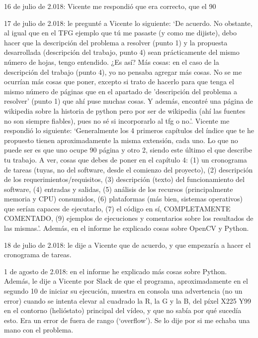 \documentclass[12pt]{article}
\begin{document}
16 de julio de 2.018: Vicente me respondió que era correcto, que el 90%

17 de julio de 2.018: le pregunté a Vicente lo siguiente: ‘De acuerdo. No obstante, al igual que en el TFG ejemplo que tú me pasaste (y como me dijiste), debo hacer que la descripción del problema a resolver (punto 1) y la propuesta desarrollada (descripción del trabajo, punto 4) sean prácticamente del mismo número de hojas, tengo entendido. ¿Es así? Más cosas: en el caso de la descripción del trabajo (punto 4), yo no pensaba agregar más cosas. No se me ocurrían más cosas que poner, excepto si trato de hacerlo para que tenga el mismo número de páginas que en el apartado de 'descripción del problema a resolver' (punto 1) que ahí puse muchas cosas. Y además, encontré una página de wikipedia sobre la historia de python pero por ser de wikipedia (ahí las fuentes no son siempre fiables), pues no sé si incorporarlo al tfg o no.’. Vicente me respondió lo siguiente: ‘Generalmente los 4 primeros capítulos del índice que te he propuesto tienen aproximadamente la misma extensión, cada uno. Lo que no puede ser es que uno ocupe 90 página y otro 2, siendo este último el que describe tu trabajo. A ver, cosas que debes de poner en el capítulo 4: (1) un cronograma de tareas (tuyas, no del software, desde el comienzo del proyecto), (2) descripción de los requerimientos/requisitos, (3) descripción (texto) del funcionamiento del software, (4) entradas y salidas, (5) análisis de los recursos (principalmente memoria y CPU) consumidos, (6) plataformas (más bien, sistemas operativos) que serían capaces de ejecutarlo, (7) el código en sí, COMPLETAMENTE COMENTADO, (9) ejemplos de ejecuciones y comentarios sobre los resultados de las mismas.’. Además, en el informe he explicado cosas sobre OpenCV y Python.

18 de julio de 2.018: le dije a Vicente que de acuerdo, y que empezaría a hacer el cronograma de tareas.

1 de agosto de 2.018: en el informe he explicado más cosas sobre Python. Además, le dije a Vicente por Slack de que el programa, aproximadamente en el segundo 10 de iniciar su ejecución, muestra en consola una advertencia (no un error) cuando se intenta elevar al cuadrado la R, la G y la B, del píxel X225 Y99 en el contorno (helióstato) principal del vídeo, y que no sabía por qué sucedía esto. Era un error de fuera de rango (‘overflow’). Se lo dije por si me echaba una mano con el problema.
\end{document}
